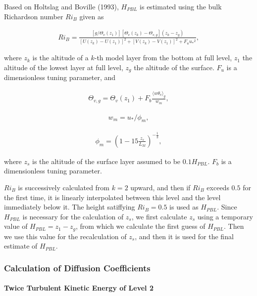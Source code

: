Based on Holtslag and Boville (1993), \(H_{PBL}\) is estimated using the
bulk Richardson number \(Ri_B\) given as

\begin{eqnarray}Ri_B=\frac{[g/\Theta_v(z_1)][\Theta_v(z_k)-\Theta_{v,g}](z_k-z_g)}{[U(z_k)-U(z_1)]^2+[V(z_k)-V(z_1)]^2+F_u{u_*}^2},\end{eqnarray}

where \(z_k\) is the altitude of a \(k\)-th model layer from the bottom
at full level, \(z_1\) the altitude of the lowest layer at full level,
\(z_g\) the altitude of the surface. \(F_u\) is a dimensionless tuning
parameter, and

\begin{eqnarray}\Theta_{v,g}=\Theta_v(z_1)+F_b \frac{\langle w\theta_v \rangle_g}{w_m},\end{eqnarray}

\begin{eqnarray}w_m=u_*/\phi_m,\end{eqnarray}

\begin{eqnarray}\phi_m=\left(1-15\frac{z_s}{L_M}\right)^{-\frac{1}{3}},\end{eqnarray}

where \(z_s\) is the altitude of the surface layer assumed to be
\(0.1H_{PBL}\). \(F_b\) is a dimensionless tuning parameter.

\(Ri_B\) is successively calculated from \(k=2\) upward, and then if
\(Ri_B\) exceeds \(0.5\) for the first time, it is linearly interpolated
between this level and the level immediately below it. The height
satiffying \(Ri_B=0.5\) is used as \(H_{PBL}\). Since \(H_{PBL}\) is
necessary for the calculation of \(z_s\), we first calculate \(z_s\)
using a temporary value of \(H_{PBL}=z_1-z_g\), from which we calculate
the first guess of \(H_{PBL}\). Then we use this value for the
recalculation of \(z_s\), and then it is used for the final estimate of
\(H_{PBL}\).

\hypertarget{calculation-of-diffusion-coefficients}{%
\subsubsection{Calculation of Diffusion
Coefficients}\label{calculation-of-diffusion-coefficients}}

\hypertarget{twice-turbulent-kinetic-energy-of-level-2}{%
\paragraph{Twice Turbulent Kinetic Energy of Level
2}\label{twice-turbulent-kinetic-energy-of-level-2}}

